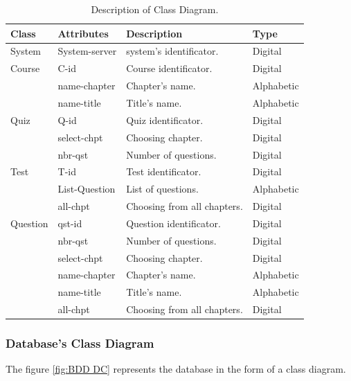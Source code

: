 \begin{table}[h!]
	\begin{center}
		\begin{tabular}{ |p{3cm}|p{3cm}|p{4cm}|p{2cm}|  }
 		\hline
 		Class & Attributes & Description & Type \\
 		\hline \hline
 		System & System-server & system's identificator. & Digital \\
 		\hline
 		Course & C-id & Course identificator. & Digital  \\
			& name-chapter & Chapter's name. & Alphabetic \\
			& name-title & Title's name. & Alphabetic \\
		\hline
		Quiz & Q-id & Quiz identificator. & Digital  \\
			& select-chpt & Choosing chapter. & Digital \\
			& nbr-qst & Number of questions. & Digital \\
		\hline
		Test & T-id & Test identificator. & Digital  \\
			& List-Question & List of questions. & Alphabetic \\
			& all-chpt & Choosing from all chapters. & Digital \\
		\hline
		Question & qst-id & Question identificator. & Digital  \\
			& nbr-qst & Number of questions. & Digital \\
			& select-chpt & Choosing chapter. & Digital \\
			& name-chapter & Chapter's name. & Alphabetic \\
			& name-title & Title's name. & Alphabetic \\
			& all-chpt & Choosing from all chapters. & Digital \\
		\hline
\end{tabular}
\end{center}
\caption{Description of Class Diagram.}
\label{tab:DC}
\end{table}


\newpage

\subsubsection{Database's Class Diagram}

The figure \ref{fig:BDD DC} represents the database in the form of a class diagram.\\\\\\

